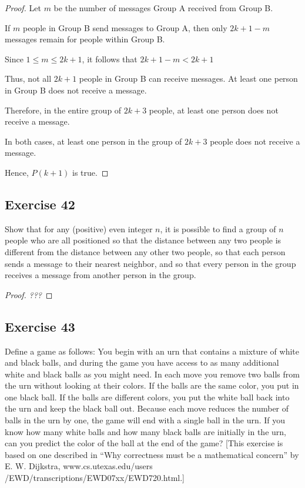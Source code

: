 \documentclass[14pt]{extarticle}
\begin{document}
\begin{proof}
    Let $m$ be the number of messages Group A received from Group B.

    If $m$ people in Group B send messages to Group A, then only $2k+1-m$ messages remain for people within Group B.

    Since $1 \leq m \leq 2k+1$, it follows that $2k+1-m < 2k+1$

    Thus, not all $2k+1$ people in Group B can receive messages. At least one person in Group B does not receive a message.

    Therefore, in the entire group of $2k+3$ people, at least one person does not receive a message.

    In both cases, at least one person in the group of $2k+3$ people does not receive a message.

    Hence, $P(k+1)$ is true.
\end{proof}

\subsection{Exercise 42}
Show that for any (positive) even integer $n$, it is possible to find a group of $n$ people who are all positioned so that the distance between any two people is different from the distance between any other two people, so that each person sends a message to their nearest neighbor, and so that every person in the group receives a message from another person in the group.

\begin{proof}
    {\it ???}
\end{proof}

\subsection{Exercise 43}
Define a game as follows: You begin with an urn that contains a mixture of white and black balls, and during the game you have access to as many additional white and black balls as you might need. In each move you remove two balls from the urn without looking at their colors. If the balls
are the same color, you put in one black ball. If the balls are different colors, you put the white ball back into the urn and keep the black ball out. Because each move reduces the number of balls in the urn by one, the game will end with a single ball in the urn. If you know how many white balls and how many black balls are initially in the urn, can you predict the color of the ball at the end of the game? [This exercise is based on one described in “Why correctness must be a mathematical concern” by E. W. Dijkstra, www.cs.utexas.edu/users /EWD/transcriptions/EWD07xx/EWD720.html.]
\end{document}
